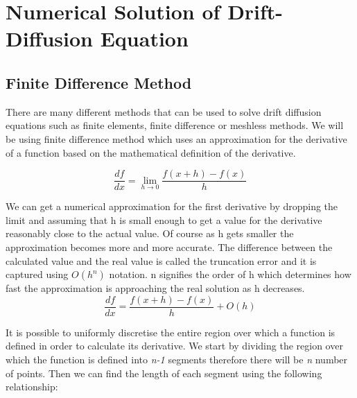 

\chapter{Numerical Solution of Drift-Diffusion Equation} %

\label{Chapter3} %



\section{Finite Difference Method}
There are many different methods that can be used to solve drift diffusion equations such as finite elements, finite difference or meshless methods. We will be using finite difference method which uses an approximation for the derivative of a function based on the mathematical definition of the derivative.

\begin{equation}
\frac{df}{dx}=\lim\limits_{h \rightarrow 0} \frac{f(x+h)-f(x)}{h}
\end{equation}

We can get a numerical approximation for the first derivative by dropping the limit and assuming that h is small enough to get a value for the derivative reasonably close to the actual value. Of course as h gets smaller the approximation becomes more and more accurate. The difference between the calculated value and the real value is called the truncation error and it is captured using $O(h^n)$ notation. n signifies the order of h which determines how fast the approximation is approaching the real solution as h decreases.  
\begin{equation}
\frac{df}{dx}=\frac{f(x+h)-f(x)}{h} + O(h)
\label{numdif}
\end{equation}

It is possible to uniformly discretise the entire region over which a function is defined in order to calculate its derivative. We start by dividing the region over which the function is defined into \textit{n-1} segments therefore there will be \textit{n} number of points. Then we can find the length of each segment using the following relationship:

